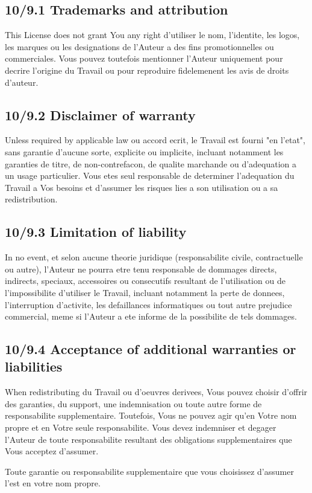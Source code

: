 \documentclass[a4paper,11pt]{article}
\begin{document}
\subsection*{10/9.1 Trademarks and attribution}

This License does not grant You any right d'utiliser le nom,
l'identite, les logos, les marques ou les designations de l'Auteur a des
fins promotionnelles ou commerciales. Vous pouvez toutefois mentionner
l'Auteur uniquement pour decrire l'origine du Travail ou pour reproduire
fidelemenent les avis de droits d'auteur.

\subsection*{10/9.2 Disclaimer of warranty}

Unless required by applicable law ou accord ecrit, le Travail est fourni
"en l'etat", sans garantie d'aucune sorte, explicite ou implicite,
incluant notamment les garanties de titre, de non-contrefacon, de qualite
marchande ou d'adequation a un usage particulier. Vous etes seul
responsable de determiner l'adequation du Travail a Vos besoins et
d'assumer les risques lies a son utilisation ou a sa redistribution.

\subsection*{10/9.3 Limitation of liability}

In no event, et selon aucune theorie juridique (responsabilite civile,
contractuelle ou autre), l'Auteur ne pourra etre tenu responsable de
dommages directs, indirects, speciaux, accessoires ou consecutifs
resultant de l'utilisation ou de l'impossibilite d'utiliser le Travail,
incluant notamment la perte de donnees, l'interruption d'activite, les
defaillances informatiques ou tout autre prejudice commercial, meme si
l'Auteur a ete informe de la possibilite de tels dommages.

\subsection*{10/9.4 Acceptance of additional warranties or liabilities}

When redistributing du Travail ou d'oeuvres derivees, Vous pouvez
choisir d'offrir des garanties, du support, une indemnisation ou toute
autre forme de responsabilite supplementaire. Toutefois, Vous ne pouvez
agir qu'en Votre nom propre et en Votre seule responsabilite. Vous devez
indemniser et degager l'Auteur de toute responsabilite resultant des
obligations supplementaires que Vous acceptez d'assumer.

Toute garantie ou responsabilite supplementaire que vous choisissez
d'assumer l'est en votre nom propre.
\end{document}
